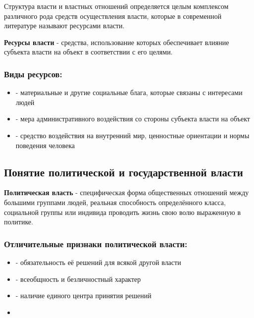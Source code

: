 Структура власти и властных отношений определяется целым комплексом различного рода
средств осуществления власти, которые в современной литературе называют ресурсами власти.

\textbf{Ресурсы власти} - средства, использование которых обеспечивает влияние субъекта
власти на объект в соответствии с его целями.

\subsubsection{Виды ресурсов:}
\begin{itemize}
      \item {} - материальные и другие социальные блага, которые
            связаны с интересами людей
      \item {} -  мера административного воздействия со стороны
            субъекта власти на объект
      \item {} - средство воздействия на внутренний мир, ценностные
            ориентации и нормы поведения человека
\end{itemize}

\subsection{Понятие политической и государственной власти}

\textbf{Политическая власть} - специфическая форма общественных отношений между большими
группами людей, реальная способность определённого класса, социальной группы или индивида
проводить жизнь свою волю выраженную в политике.

\subsubsection{Отличительные признаки политической власти:}

\begin{itemize}
      \item {} - обязательность её решений для всякой другой
            власти
      \item {} - всеобщность и безличностный характер
      \item {} - наличие единого центра принятия решений
      \item {}
\end{itemize}

